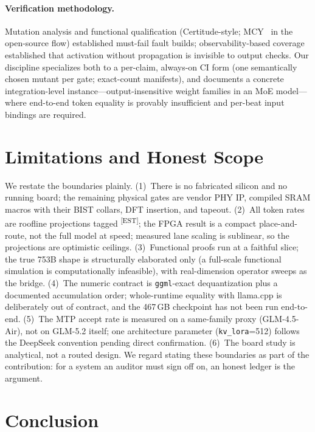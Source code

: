 \documentclass[11pt]{article}
\newcommand{\code}[1]{\texttt{#1}}
\newcommand{\est}{\textsuperscript{[EST]}}
\begin{document}
\paragraph{Verification methodology.} Mutation analysis and functional
qualification (Certitude-style; MCY~\cite{mcy} in the open-source flow)
established must-fail fault builds; observability-based coverage~\cite{occom}
established that activation without propagation is invisible to output checks.
Our discipline specializes both to a per-claim, always-on CI form (one
semantically chosen mutant per gate; exact-count manifests), and documents a
concrete integration-level instance---output-insensitive weight families in an
MoE model---where end-to-end token equality is provably insufficient and
per-beat input bindings are required.

\section{Limitations and Honest Scope}

We restate the boundaries plainly. (1)~There is no fabricated silicon and no
running board; the remaining physical gates are vendor PHY IP, compiled SRAM
macros with their BIST collars, DFT insertion, and tapeout. (2)~All token rates
are roofline projections tagged \est; the FPGA result is a compact
place-and-route, not the full model at speed; measured lane scaling is
sublinear, so the projections are optimistic ceilings. (3)~Functional proofs
run at a faithful slice; the true 753B shape is structurally elaborated only
(a full-scale functional simulation is computationally infeasible), with
real-dimension operator sweeps as the bridge. (4)~The numeric contract is
\code{ggml}-exact dequantization plus a documented accumulation order;
whole-runtime equality with llama.cpp is deliberately out of contract, and the
467\,GB checkpoint has not been run end-to-end. (5)~The MTP accept rate is
measured on a same-family proxy (GLM-4.5-Air), not on GLM-5.2 itself; one
architecture parameter (\code{kv\_lora}=512) follows the DeepSeek convention
pending direct confirmation. (6)~The board study is analytical, not a routed
design. We regard stating these boundaries as part of the contribution: for a
system an auditor must sign off on, an honest ledger is the argument.

\section{Conclusion}
\end{document}
